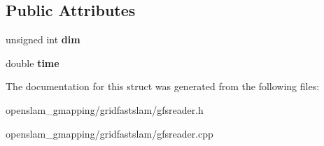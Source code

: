 \subsection*{Public Attributes}
\begin{DoxyCompactItemize}
\item 
\mbox{\label{structGMapping_1_1GFSReader_1_1Record_a0fd08d351e898015f374e35953431387}} 
unsigned int {\bfseries dim}
\item 
\mbox{\label{structGMapping_1_1GFSReader_1_1Record_aabfa3ca0afb2a0af5c08443222f4c2b8}} 
double {\bfseries time}
\end{DoxyCompactItemize}


The documentation for this struct was generated from the following files\+:\begin{DoxyCompactItemize}
\item 
openslam\+\_\+gmapping/gridfastslam/gfsreader.\+h\item 
openslam\+\_\+gmapping/gridfastslam/gfsreader.\+cpp\end{DoxyCompactItemize}
